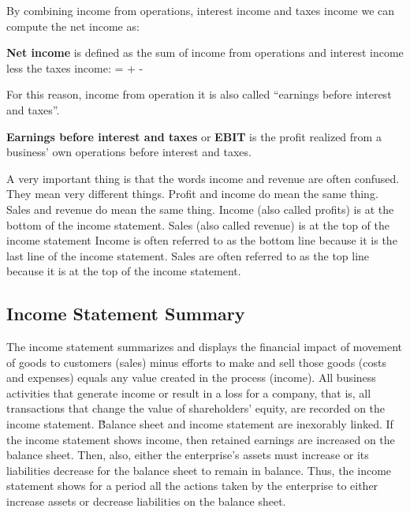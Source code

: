 By combining income from operations, interest income and taxes income we can compute the net income as:

\textbf{Net income} is defined as the sum of income from operations and interest income less the taxes income:
\bse
{} =  +  - 
\ese
\ed

For this reason, income from operation it is also called ``earnings before interest and taxes''.

\textbf{Earnings before interest and taxes} or \textbf{EBIT} is the profit realized from a business' own operations
before interest and taxes.
\ed

A very important thing is that the words income and revenue are often confused. They mean very different
things. Profit and income do mean the same thing. Sales and revenue do mean the same thing. Income (also called
profits) is at the bottom of the income statement. Sales (also called revenue) is at the top of the income statement
Income is often referred to as the bottom line because it is the last line of the income statement. Sales are
often referred to as the top line because it is at the top of the income statement.

\subsection{Income Statement Summary}


The income statement summarizes and displays the financial impact of movement of goods to customers (sales) minus
efforts to make and sell those goods (costs and expenses) equals any value created in the process (income). All
business activities that generate income or result in a loss for a company, that is, all transactions that change the
value of shareholders' equity, are recorded on the income statement. \v

Balance sheet and income statement are inexorably linked. If the income statement shows income, then retained
earnings are increased on the balance sheet. Then, also, either the enterprise's assets must increase or its
liabilities decrease for the balance sheet to remain in balance. Thus, the income statement shows for a period all
the actions taken by the enterprise to either increase assets or decrease liabilities on the balance sheet.

